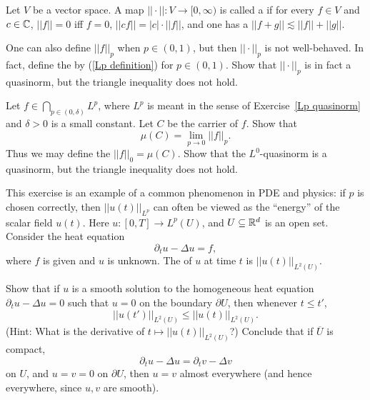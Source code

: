 \begin{definition}
Let $V$ be a vector space.
A map $||\cdot||: V \to [0, \infty)$ is called a  if for every $f \in V$ and $c \in \mathbb{C}$, $||f|| = 0$ iff $f = 0$, $||cf|| = |c|\cdot||f||$, and one has a  $||f + g|| \lesssim ||f|| + ||g||$.
\end{definition}

\begin{exercise}
\label{Lp quasinorm}
One can also define $||f||_{p} $ when $p \in (0, 1)$, but then $||\cdot||_{p} $ is not well-behaved.
In fact, define the  by (\ref{Lp definition}) for $p \in (0, 1)$.
Show that $||\cdot||_{p} $ is in fact a quasinorm, but the triangle inequality does not hold.
\end{exercise}

\begin{exercise}
Let $f \in \bigcap_{p \in (0, \delta)} L^p$, where $L^p$ is meant in the sense of Exercise~\ref{Lp quasinorm} and $\delta > 0$ is a small constant.
Let $C$ be the carrier of $f$. Show that
\[\mu(C) = \lim_{p \to 0} ||f||_{p} .\]
Thus we may define the  $||f||_0 = \mu(C)$.
Show that the $L^0$-quasinorm is a quasinorm, but the triangle inequality does not hold.
\end{exercise}

\begin{exercise}
This exercise is an example of a common phenomenon in PDE and physics: if $p$ is chosen correctly, then $||u(t)||_{L^p}$ can often be viewed as the ``energy'' of the scalar field $u(t)$. Here $u: [0, T] \to L^p(U)$, and $U \subseteq \mathbb{R}^d$ is an open set.
Consider the heat equation
\[\partial_{t} u - \Delta u = f,\]
where $f$ is given and $u$ is unknown. The  of $u$ at time $t$ is $||u(t)||_{L^2(U)}$.

Show that if $u$ is a smooth solution to the homogeneous heat equation $\partial_{t} u - \Delta u = 0$ such that $u = 0$ on the boundary $\partial U$, then whenever $t \leq t'$,
\[||u(t')||_{L^2(U)} \leq ||u(t)||_{L^2(U)}.\]
(Hint: What is the derivative of $t \mapsto ||u(t)||_{L^2(U)}$?)
Conclude that if $\overline U$ is compact,
\[\partial_{t} u - \Delta u = \partial_{t} v - \Delta v\]
on $U$, and $u = v = 0$ on $\partial U$, then $u = v$ almost everywhere (and hence everywhere, since $u,v$ are smooth).
\end{exercise}

